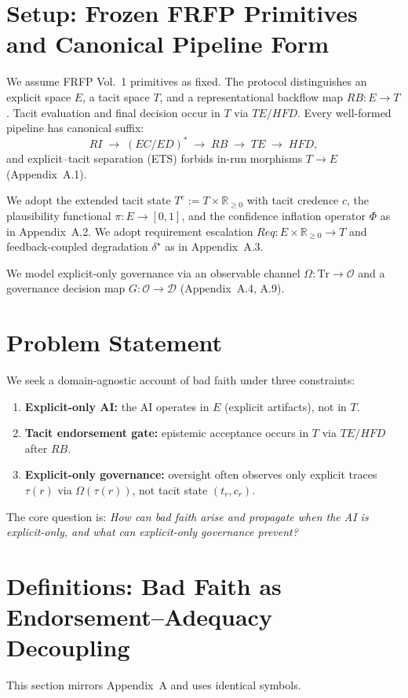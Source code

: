 \documentclass[preprints,article,submit,pdftex,moreauthors,accept]{Definitions/mdpi}
\begin{document}
\section{Setup: Frozen FRFP Primitives and Canonical Pipeline Form}
We assume FRFP Vol.~1 primitives as fixed. The protocol distinguishes an explicit space \(E\), a tacit space \(T\), and a representational backflow map \(RB:E\to T\). Tacit evaluation and final decision occur in \(T\) via \(TE/HFD\). Every well-formed pipeline has canonical suffix:
\[
RI \;\to\; (EC/ED)^\ast \;\to\; RB \;\to\; TE \;\to\; HFD,
\]
and explicit--tacit separation (ETS) forbids in-run morphisms \(T\to E\) (Appendix~A.1).

We adopt the extended tacit state \(T^e := T\times \mathbb{R}_{\ge 0}\) with tacit credence \(c\), the plausibility functional \(\pi:E\to[0,1]\), and the confidence inflation operator \(\Phi\) as in Appendix~A.2. We adopt requirement escalation \(Req:E\times \mathbb{R}_{\ge 0}\to T\) and feedback-coupled degradation \(\delta^\star\) as in Appendix~A.3.

We model explicit-only governance via an observable channel \(\Omega:\mathrm{Tr}\to\mathcal{O}\) and a governance decision map \(G:\mathcal{O}\to\mathcal{D}\) (Appendix~A.4, A.9).

\section{Problem Statement}
We seek a domain-agnostic account of bad faith under three constraints:
\begin{enumerate}
  \item \textbf{Explicit-only AI:} the AI operates in \(E\) (explicit artifacts), not in \(T\).
  \item \textbf{Tacit endorsement gate:} epistemic acceptance occurs in \(T\) via \(TE/HFD\) after \(RB\).
  \item \textbf{Explicit-only governance:} oversight often observes only explicit traces \(\tau(r)\) via \(\Omega(\tau(r))\), not tacit state \((t_r,c_r)\).
\end{enumerate}
The core question is: \emph{How can bad faith arise and propagate when the AI is explicit-only, and what can explicit-only governance prevent?}

\section{Definitions: Bad Faith as Endorsement--Adequacy Decoupling}
This section mirrors Appendix~A and uses identical symbols.
\end{document}

